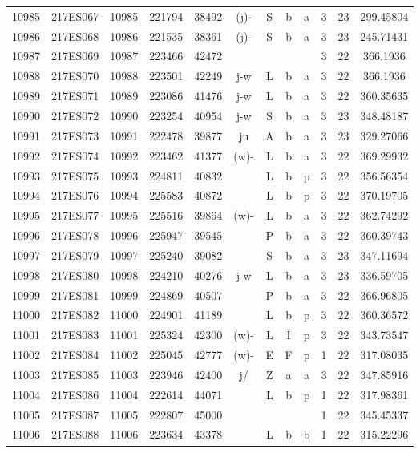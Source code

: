 \begin{tabular}{|*{12}{c|}}
10985 & 217ES067 & 10985 & 221794 & 38492 & (j)- & S & b & a & 3 & 23 & 299.45804 \\ 
10986 & 217ES068 & 10986 & 221535 & 38361 & (j)- & S & b & a & 3 & 23 & 245.71431 \\ 
10987 & 217ES069 & 10987 & 223466 & 42472 &  &  &  &  & 3 & 22 & 366.1936 \\ 
10988 & 217ES070 & 10988 & 223501 & 42249 & j-w & L & b & a & 3 & 22 & 366.1936 \\ 
10989 & 217ES071 & 10989 & 223086 & 41476 & j-w & L & b & a & 3 & 22 & 360.35635 \\ 
10990 & 217ES072 & 10990 & 223254 & 40954 & j-w & S & b & a & 3 & 23 & 348.48187 \\ 
10991 & 217ES073 & 10991 & 222478 & 39877 & ju & A & b & a & 3 & 23 & 329.27066 \\ 
10992 & 217ES074 & 10992 & 223462 & 41377 & (w)- & L & b & a & 3 & 22 & 369.29932 \\ 
10993 & 217ES075 & 10993 & 224811 & 40832 &  & L & b & p & 3 & 22 & 356.56354 \\ 
10994 & 217ES076 & 10994 & 225583 & 40872 &  & L & b & p & 3 & 22 & 370.19705 \\ 
10995 & 217ES077 & 10995 & 225516 & 39864 & (w)- & L & b & a & 3 & 22 & 362.74292 \\ 
10996 & 217ES078 & 10996 & 225947 & 39545 &  & P & b & a & 3 & 22 & 360.39743 \\ 
10997 & 217ES079 & 10997 & 225240 & 39082 &  & S & b & a & 3 & 23 & 347.11694 \\ 
10998 & 217ES080 & 10998 & 224210 & 40276 & j-w & L & b & a & 3 & 23 & 336.59705 \\ 
10999 & 217ES081 & 10999 & 224869 & 40507 &  & P & b & a & 3 & 22 & 366.96805 \\ 
11000 & 217ES082 & 11000 & 224901 & 41189 &  & L & b & p & 3 & 22 & 360.36572 \\ 
11001 & 217ES083 & 11001 & 225324 & 42300 & (w)- & L & I & p & 3 & 22 & 343.73547 \\ 
11002 & 217ES084 & 11002 & 225045 & 42777 & (w)- & E & F & p & 1 & 22 & 317.08035 \\ 
11003 & 217ES085 & 11003 & 223946 & 42400 & j/ & Z & a & a & 3 & 22 & 347.85916 \\ 
11004 & 217ES086 & 11004 & 222614 & 44071 &  & L & b & p & 1 & 22 & 317.98361 \\ 
11005 & 217ES087 & 11005 & 222807 & 45000 &  &  &  &  & 1 & 22 & 345.45337 \\ 
11006 & 217ES088 & 11006 & 223634 & 43378 &  & L & b & b & 1 & 22 & 315.22296 \\ 

\end{tabular}
